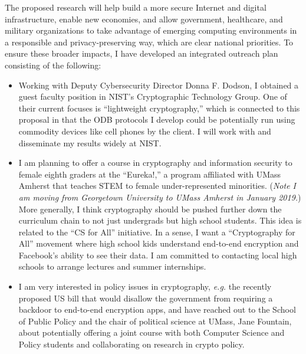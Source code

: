 The proposed research will help build  a more secure Internet and digital infrastructure,  enable  new economies, and allow government, healthcare, and military organizations to take advantage of emerging  computing environments   in a responsible and privacy-preserving way, which are clear national priorities.  
To ensure these broader impacts, I have developed an integrated outreach plan consisting of the following: %

\begin{itemize}
\item Working with Deputy Cybersecurity Director Donna F. Dodson, I  obtained a guest faculty position in NIST's Cryptographic Technology Group.
One of their current focuses is ``lightweight cryptography,'' which is  connected to this proposal in that the ODB protocols I develop could be potentially run using commodity devices like cell phones by the client.  I will work with and disseminate my results widely at NIST.

\item I am planning to offer a course in cryptography and information security to female eighth graders at the ``Eureka!,'' a program affiliated with UMass Amherst that teaches STEM to female under-represented minorities. (\emph{Note I am moving from Georgetown University to UMass Amherst in January 2019.}) More generally, I think cryptography should be pushed further down the curriculum chain to not just undergrads but high school students.  This idea is related to the ``CS for All'' initiative.  In a sense, I want a ``Cryptography for All'' movement where high school kids understand end-to-end encryption and Facebook's ability to see their data.  I am committed to contacting local high schools to arrange lectures and summer internships.

\item I am very interested in policy  issues in cryptography, \emph{e.g.} the recently proposed US bill that would disallow the government from requiring a backdoor to end-to-end encryption apps, and have reached out to the School of Public Policy and the chair of political science at UMass, Jane Fountain,  about potentially offering a joint course with both Computer Science and Policy students and collaborating on research in crypto policy.  %
\end{itemize}


